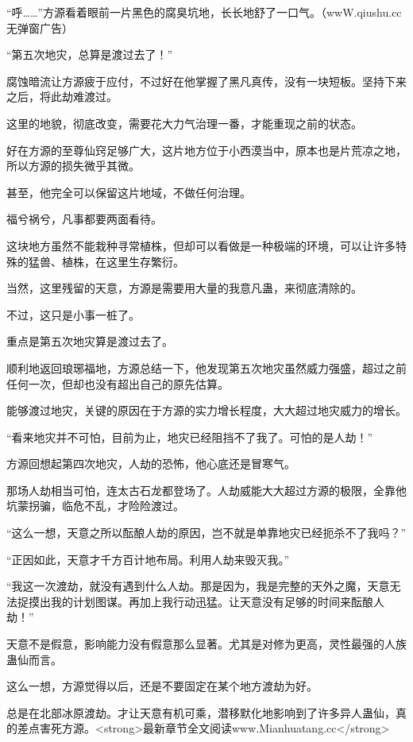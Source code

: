 
\begin{this_body}

“呼……”方源看着眼前一片黑色的腐臭坑地，长长地舒了一口气。（wwW.qiushu.cc 无弹窗广告）

“第五次地灾，总算是渡过去了！”

腐蚀暗流让方源疲于应付，不过好在他掌握了黑凡真传，没有一块短板。坚持下来之后，将此劫难渡过。

这里的地貌，彻底改变，需要花大力气治理一番，才能重现之前的状态。

好在方源的至尊仙窍足够广大，这片地方位于小西漠当中，原本也是片荒凉之地，所以方源的损失微乎其微。

甚至，他完全可以保留这片地域，不做任何治理。

福兮祸兮，凡事都要两面看待。

这块地方虽然不能栽种寻常植株，但却可以看做是一种极端的环境，可以让许多特殊的猛兽、植株，在这里生存繁衍。

当然，这里残留的天意，方源是需要用大量的我意凡蛊，来彻底清除的。

不过，这只是小事一桩了。

重点是第五次地灾算是渡过去了。

顺利地返回琅琊福地，方源总结一下，他发现第五次地灾虽然威力强盛，超过之前任何一次，但却也没有超出自己的原先估算。

能够渡过地灾，关键的原因在于方源的实力增长程度，大大超过地灾威力的增长。

“看来地灾并不可怕，目前为止，地灾已经阻挡不了我了。可怕的是人劫！”

方源回想起第四次地灾，人劫的恐怖，他心底还是冒寒气。

那场人劫相当可怕，连太古石龙都登场了。人劫威能大大超过方源的极限，全靠他坑蒙拐骗，临危不乱，才险险渡过。

“这么一想，天意之所以酝酿人劫的原因，岂不就是单靠地灾已经扼杀不了我吗？”

“正因如此，天意才千方百计地布局。利用人劫来毁灭我。”

“我这一次渡劫，就没有遇到什么人劫。那是因为，我是完整的天外之魔，天意无法捉摸出我的计划图谋。再加上我行动迅猛。让天意没有足够的时间来酝酿人劫！”

天意不是假意，影响能力没有假意那么显著。尤其是对修为更高，灵性最强的人族蛊仙而言。

这么一想，方源觉得以后，还是不要固定在某个地方渡劫为好。

总是在北部冰原渡劫。才让天意有机可乘，潜移默化地影响到了许多异人蛊仙，真的差点害死方源。<strong>最新章节全文阅读www.Mianhuatang.cc</strong>


\end{this_body}
